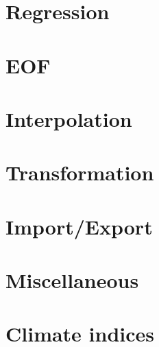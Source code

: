 \newpage
\section{Regression}




\newpage
\section{EOF}




\newpage
\section{Interpolation}




\newpage
\section{Transformation}




\newpage
\section{Import/Export}




\newpage
\section{Miscellaneous}




\newpage
\section{Climate indices}




